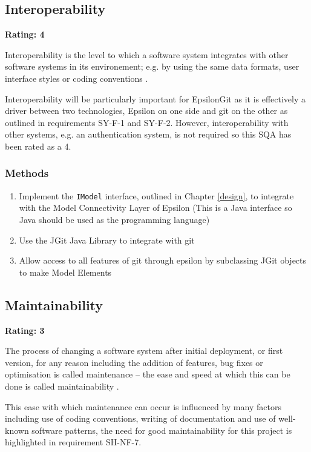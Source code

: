 \documentclass[11pt]{book}
\newcommand{\code}[1]{\texttt{#1}}
\begin{document}
\subsection{Interoperability}
\textbf{Rating: 4}

Interoperability is the level to which a software system integrates with other software systems in its environement; e.g. by using the same data formats, user interface styles or coding conventions \cite{integrationdefinition}.

Interoperability will be particularly important for EpsilonGit as it is effectively a driver between two technologies, Epsilon on one side and git on the other as outlined in requirements SY-F-1 and SY-F-2. However, interoperability with other systems, e.g. an authentication system, is not required so this SQA has been rated as a 4.

\subsubsection{Methods}
\begin{enumerate}
	\item Implement the \code{IModel} interface, outlined in Chapter \ref{design}, to integrate with the Model Connectivity Layer of Epsilon (This is a Java interface so Java should be used as the programming language) 
	\item Use the JGit Java Library to integrate with git
	\item Allow access to all features of git through epsilon by subclassing JGit objects to make Model Elements
\end{enumerate}

\subsection{Maintainability}
\textbf{Rating: 3}

The process of changing a software system after initial deployment, or first version, for any reason including the addition of features, bug fixes or optimisation is called maintenance -- the ease and speed at which this can be done is called maintainability \cite{maintainabilitydefinition}. 

This ease with which maintenance can occur is influenced by many factors including use of coding conventions, writing of documentation and use of well-known software patterns, the need for good maintainability for this project is highlighted in requirement SH-NF-7.
\end{document}
